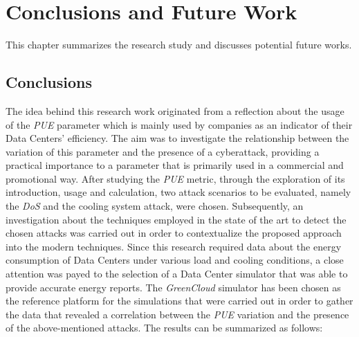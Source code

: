 \chapter{Conclusions and Future Work}

\begin{citazione}
This chapter summarizes the research study
and discusses potential future works.
\end{citazione}
\newpage

\section{Conclusions} 
The idea behind this research work originated from a reflection about the usage of the \emph{PUE} parameter which is mainly used by companies as an indicator of their Data Centers' efficiency. The aim was to investigate the relationship between the variation of this parameter and the presence of a cyberattack, providing a practical importance to a parameter that is primarily used in a commercial and promotional way. After studying the \emph{PUE} metric, through the exploration of its introduction, usage and calculation, two attack scenarios to be evaluated, namely the \emph{DoS} and the cooling system attack, were chosen. Subsequently, an investigation about the techniques employed in the state of the art to detect the chosen attacks was carried out in order to contextualize the proposed approach into the modern techniques. Since this research required data about the energy consumption of Data Centers under various load and cooling conditions, a close attention was payed to the selection of a Data Center simulator that was able to provide accurate energy reports. The \emph{GreenCloud} simulator has been chosen as the reference platform for the simulations that were carried out in order to gather the data that revealed a correlation between the \emph{PUE} variation and the presence of the above-mentioned attacks. The results can be summarized as follows:
